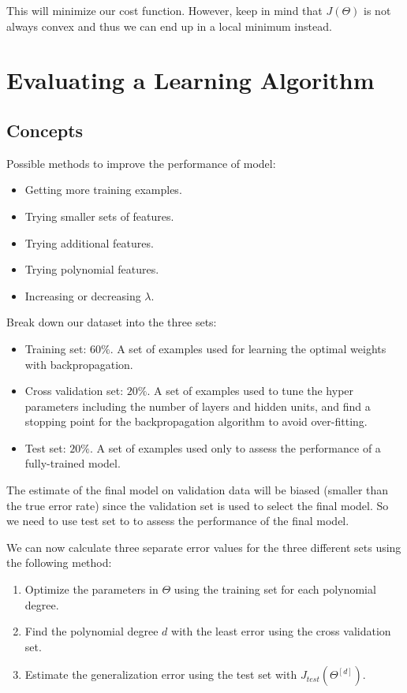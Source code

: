 \documentclass{article}
\begin{document}
This will minimize our cost function. However, keep in mind that \(J(\Theta)\) is not always convex and thus we can end up in a local minimum instead. 

\section{Evaluating a Learning Algorithm}

\subsection{Concepts}

Possible methods to improve the performance of model:
\begin{itemize}
\item Getting more training examples.
\item Trying smaller sets of features.
\item Trying additional features.
\item Trying polynomial features.
\item Increasing or decreasing \(\lambda\).
\end{itemize}

Break down our dataset into the three sets:
\begin{itemize}
\item Training set: \(60\%\). A set of examples used for learning the optimal weights with backpropagation.
\item Cross validation set: \(20\%\). A set of examples used to tune the hyper parameters including the number of layers and hidden units, and find a stopping point for the backpropagation algorithm to avoid over-fitting.
\item Test set: \(20\%\). A set of examples used only to assess the performance of a fully-trained model.
\end{itemize}

The estimate of the final model on validation data will be biased (smaller than the true error rate) since the validation set is used to select the final model. So we need to use test set to to assess the performance of the final model.

We can now calculate three separate error values for the three different sets using the following method:
\begin{enumerate}
\item Optimize the parameters in \(\Theta\) using the training set for each polynomial degree.
\item Find the polynomial degree \(d\) with the least error using the cross validation set.
\item Estimate the generalization error using the test set with \(J_{test}(\Theta^{[d]})\).
\end{enumerate}
\end{document}
